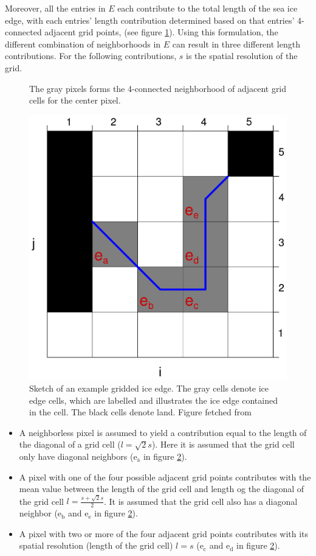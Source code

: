 \documentclass[../main/thesis.tex]{subfiles}
\begin{document}
Moreover, all the entries in $E$ each contribute to the total length of the sea ice edge, with each entries' length contribution determined based on that entries' 4-connected adjacent grid points, (see figure \ref{fig:4-connection}). Using this formulation, the different combination of neighborhoods in $E$ can result in three different length contributions. For the following contributions, $s$ is the spatial resolution of the grid.

\begin{figure}
    \centering
    
    \caption{\label{fig:4-connection}The gray pixels forms the 4-connected neighborhood of adjacent grid cells for the center pixel.}
\end{figure}

\begin{figure}
    \centering
    \includegraphics[width = .5\textwidth]{MelsomIEL.pdf}
    \caption{\label{fig:iceedgeschematic}Sketch of an example gridded ice edge. The gray cells denote ice edge cells, which are labelled and illustrates the ice edge contained in the cell. The black cells denote land. Figure fetched from \protect\citep{Melsom2019}}
\end{figure}

\begin{itemize}
    \item A neighborless pixel is assumed to yield a contribution equal to the length of the diagonal of a grid cell ($l = \sqrt2s$). Here it is assumed that the grid cell only have diagonal neighbors ($\text{e}_\text{a}$ in figure \ref{fig:iceedgeschematic}).
    \item A pixel with one of the four possible adjacent grid points contributes with the mean value between the length of the grid cell and length og the diagonal of the grid cell $l = \frac{s + \sqrt2s}{2}$. It is assumed that the grid cell also has a diagonal neighbor ($\text{e}_\text{b}$ and $\text{e}_\text{e}$ in figure \ref{fig:iceedgeschematic}).
    \item A pixel with two or more of the four adjacent grid points contributes with its spatial resolution (length of the grid cell) $l = s$ ($\text{e}_\text{c}$ and $\text{e}_\text{d}$ in figure \ref{fig:iceedgeschematic}).
\end{itemize}
\end{document}
